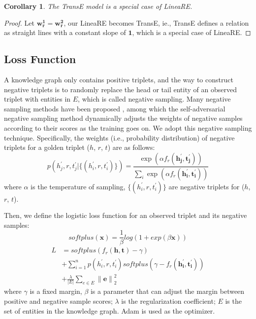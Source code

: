 \documentclass[conference]{IEEEtran}
\newtheorem{corollary}{Corollary}
\begin{document}
\begin{corollary}
	The TransE model is a special case of LineaRE.
\end{corollary}
\begin{proof}
	Let $\bm{w_r^{1}} = \bm{w_r^{2}}$, our LineaRE becomes TransE, ie., TransE defines a relation as straight lines with a constant slope of $\bm{1}$, which is a special case of LineaRE.
\end{proof}

\subsection{Loss Function}
A knowledge graph only contains positive triplets, and the way to construct negative triplets is to randomly replace the head or tail entity of an observed triplet with entities in $E$, which is called negative sampling. Many negative sampling methods have been proposed \cite{Kbgan,NSCaching,IGAN}, among which the self-adversarial negative sampling method \cite{RotatE} dynamically adjusts the weights of negative samples according to their scores as the training goes on. We adopt this negative sampling technique. Specifically, the weights (i.e., probability distribution) of negative triplets for a golden triplet ($h$, $r$, $t$) are as follows:
\begin{equation}
	p(
		h_{j}^{'}, r, t_{j}^{'} | \{(h_i^{'}, r, t_i^{'})\}
	)
	=
	\frac{
		\exp(\alpha f_r(\bm{h_{j}^{'}}, \bm{t_{j}^{'}}))
	}
	{
		\sum_{i} \exp(\alpha f_r(\bm{h_{i}^{'}}, \bm{t_{i}^{'}}))
	}
\end{equation}
where $\alpha$ is the temperature of sampling, $\{(h_i^{'}, r, t_i^{'})\}$ are negative triplets for ($h$, $r$, $t$).

Then, we define the logistic loss function for an observed triplet and its negative samples:
\begin{equation}
	softplus(\bm{x}) = \frac{1}{\beta}log(1+exp(\beta \bm{x}))
\end{equation}
\begin{align}
	L & = softplus(f_r(\bm{h}, \bm{t})-\gamma) \nonumber \\
	  & + \sum_{i=1}^{n} p(h_{i}^{'}, r, t_{i}^{'})softplus(\gamma - f_r(\bm{h_{i}^{'}}, \bm{t_{i}^{'}})) \nonumber \\
	  & + \frac{\lambda}{|E|} \sum_{e \in E} \left \| \bm{e} \right \|_{2}^{2}
\end{align}
where $\gamma$ is a fixed margin, $\beta$ is a parameter that can adjust the margin between positive and negative sample scores; $\lambda$ is the regularization coefficient; $E$ is the set of entities in the knowledge graph. Adam \cite{Adam} is used as the optimizer.
\end{document}
